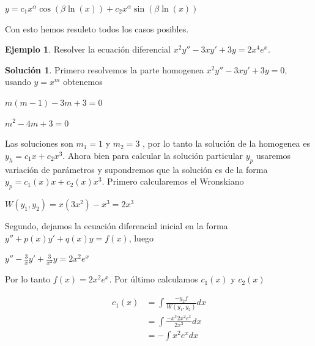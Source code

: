 \documentclass{article}
\theoremstyle{plain}
\theoremstyle{definition}
\newtheorem{ejem}[thm]{Ejemplo}
\newtheorem{sol}[thm]{Solución}
\begin{document}
\begin{center}
$y = c_1 x^{\alpha}\cos(\beta \ln(x)) +c_2 x^{\alpha}\sin(\beta \ln(x)) $
\end{center}


Con esto hemos resuleto todos los casos posibles. \\





\begin{ejem}Resolver la ecuación diferencial $x^2y''-3xy'+3y=2x^4e^x$. \\
\end{ejem}


\begin{sol}Primero resolvemos la parte homogenea $x^2y''-3xy'+3y =0$, usando $y=x^m$ obtenemos
\end{sol}

\begin{center}
$m(m-1)-3m+3=0$
\end{center}


\begin{center}
$m^2-4m+3=0$
\end{center}

Las soluciones son $m_1= 1$ y $m_2=3$ , por lo tanto la solución de la homogenea es $y_h = c_1 x+c_2x^3$. Ahora bien para calcular la solución particular $y_p$ usaremos variación de parámetros y supondremos que la solución es de la forma $y_p =c_1(x)x +c_2(x)x^3$. Primero calcularemos el Wronskiano

\begin{center}
$W(y_1,y_2) = x(3x^2)-x^3 = 2x^3$
\end{center}

Segundo, dejamos la ecuación diferencial inicial en la forma $y''+p(x)y'+q(x)y=f(x)$, luego


\begin{center}
$\displaystyle y'' -\frac{3}{x} y'+\frac{3}{x^2} y=2x^2e^x$
\end{center}

Por lo tanto $f(x) = 2x^2e^x$. Por último calculamos $c_1(x)$ y $c_2(x)$

\begin{align*}
\displaystyle c_1(x) &= \int \frac{-y_2 f}{W(y_1,y_2)} dx \\
&= \int \frac{-x^3 2x^2e^x}{2x^3} dx \\
&= -\int x^2e^x dx \\
\end{align*}
\end{document}
